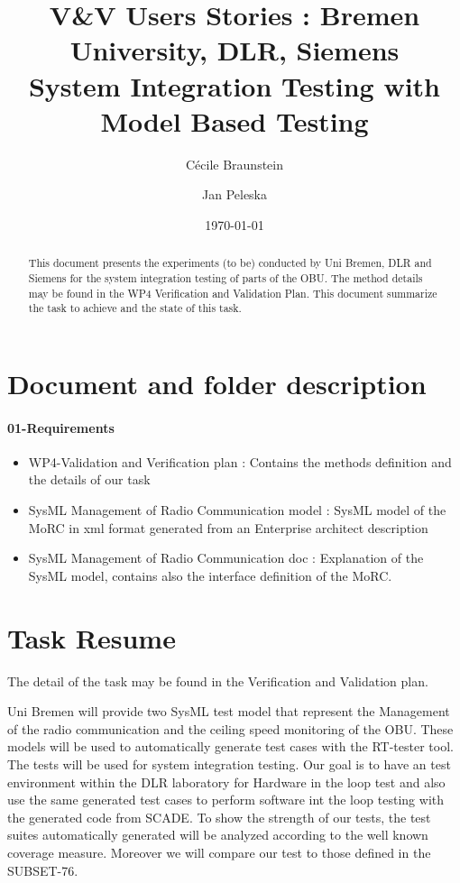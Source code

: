 \documentclass[11pt, a4paper]{article}
\title{V\&V Users Stories : Bremen University, DLR, Siemens
\\
\normalsize{System Integration Testing with Model Based Testing}
}
\author{Cécile Braunstein \and Jan Peleska}
\date{\today}
\begin{document}
\maketitle

\begin{abstract}
This document presents the experiments (to be) conducted by Uni Bremen, DLR
and Siemens  for the system integration testing of parts of the OBU. 
The method details may be found in the WP4 Verification and Validation
Plan. This document summarize the task to achieve  and the state of
this task.
\end{abstract}



\section{Document and folder description}
\paragraph{01-Requirements}
\begin{itemize}
  \item WP4-Validation and Verification plan : Contains the methods
  definition and the details of our task
  \item SysML Management of Radio Communication model : SysML model of
    the MoRC in xml format generated from an Enterprise architect description
  \item SysML Management of Radio Communication doc : Explanation of
    the SysML model, contains also the interface definition of the
    MoRC. 
\end{itemize}

\section{Task Resume}
The detail of the task may be found in the Verification and Validation
plan.

Uni Bremen will provide two SysML test model that represent the
Management of the radio communication and the ceiling speed monitoring
of the OBU. These models will be used to automatically generate test
cases with the RT-tester tool. The tests will be used for system
integration testing. Our goal is to have an test environment within
the DLR laboratory for Hardware in the loop test and also use the same
generated test cases to perform software int the loop testing with the
generated code from SCADE.
To show the strength of our tests, the test suites automatically
generated will be analyzed according to the well known coverage
measure. Moreover we will compare our test to those defined in the SUBSET-76.
\end{document}
